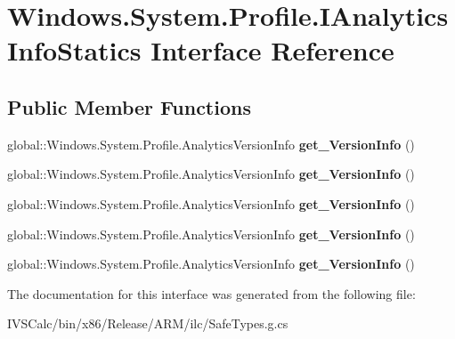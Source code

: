 \hypertarget{interface_windows_1_1_system_1_1_profile_1_1_i_analytics_info_statics}{}\section{Windows.\+System.\+Profile.\+I\+Analytics\+Info\+Statics Interface Reference}
\label{interface_windows_1_1_system_1_1_profile_1_1_i_analytics_info_statics}
\subsection*{Public Member Functions}
\begin{DoxyCompactItemize}
\item 
\mbox{\label{interface_windows_1_1_system_1_1_profile_1_1_i_analytics_info_statics_ae4ae8aa27295a5e0c5239370dbf06499}} 
global\+::\+Windows.\+System.\+Profile.\+Analytics\+Version\+Info {\bfseries get\+\_\+\+Version\+Info} ()
\item 
\mbox{\label{interface_windows_1_1_system_1_1_profile_1_1_i_analytics_info_statics_ae4ae8aa27295a5e0c5239370dbf06499}} 
global\+::\+Windows.\+System.\+Profile.\+Analytics\+Version\+Info {\bfseries get\+\_\+\+Version\+Info} ()
\item 
\mbox{\label{interface_windows_1_1_system_1_1_profile_1_1_i_analytics_info_statics_ae4ae8aa27295a5e0c5239370dbf06499}} 
global\+::\+Windows.\+System.\+Profile.\+Analytics\+Version\+Info {\bfseries get\+\_\+\+Version\+Info} ()
\item 
\mbox{\label{interface_windows_1_1_system_1_1_profile_1_1_i_analytics_info_statics_ae4ae8aa27295a5e0c5239370dbf06499}} 
global\+::\+Windows.\+System.\+Profile.\+Analytics\+Version\+Info {\bfseries get\+\_\+\+Version\+Info} ()
\item 
\mbox{\label{interface_windows_1_1_system_1_1_profile_1_1_i_analytics_info_statics_ae4ae8aa27295a5e0c5239370dbf06499}} 
global\+::\+Windows.\+System.\+Profile.\+Analytics\+Version\+Info {\bfseries get\+\_\+\+Version\+Info} ()
\end{DoxyCompactItemize}


The documentation for this interface was generated from the following file\+:\begin{DoxyCompactItemize}
\item 
I\+V\+S\+Calc/bin/x86/\+Release/\+A\+R\+M/ilc/Safe\+Types.\+g.\+cs\end{DoxyCompactItemize}
